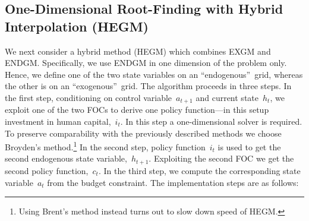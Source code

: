 \documentclass[a4paper,12pt]{article}%
\begin{document}
\subsection{One-Dimensional Root-Finding with Hybrid Interpolation (HEGM)}

We next consider a hybrid method (HEGM) which combines EXGM and ENDGM. Specifically, we use ENDGM in one dimension of the problem only. Hence, we define one of the two state variables on an \textquotedblleft endogenous\textquotedblright\ grid, whereas the other is on an \textquotedblleft exogenous\textquotedblright\ grid. The algorithm proceeds in three steps. In the first step, conditioning on control variable~$a_{t+1}$ and current state~$h_{t}$, we exploit one of the two FOCs to derive one policy function---in this setup investment in human capital,~$i_{t}$. In this step a one-dimensional solver is required. To preserve comparability with the previously described methods we choose Broyden's method.\footnote{Using Brent's method instead turns out to slow down speed of HEGM.}
In the second step, policy function~$i_{t}$ is used to get the second endogenous state variable,~$h_{t+1}$. Exploiting the second FOC we get the second policy function,~$c_{t}$. In the third step, we compute the corresponding state variable~$a_{t}$ from the budget constraint. The implementation steps are as follows:
\end{document}
